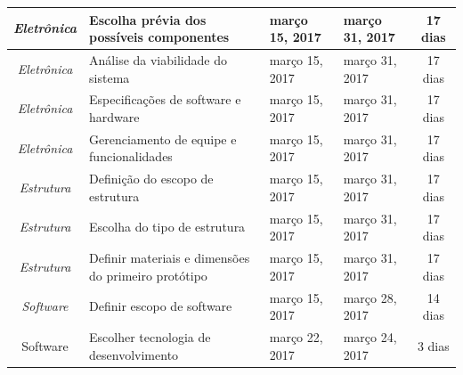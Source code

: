 \begin{longtable}{|c|m{6.5cm}|m{3.2cm}|m{3.2cm}|c|}
\textit{Eletrônica}                                                       & Escolha prévia dos possíveis componentes             & março 15, 2017                       & março 31, 2017                    & 17 dias                               \\ \hline
\textit{Eletrônica}                                                       & Análise da viabilidade do sistema                    & março 15, 2017                       & março 31, 2017                    & 17 dias                               \\ \hline
\textit{Eletrônica}                                                       & Especificações de software e hardware                & março 15, 2017                       & março 31, 2017                    & 17 dias                               \\ \hline
\textit{Eletrônica}                                                       & Gerenciamento de equipe e funcionalidades            & março 15, 2017                       & março 31, 2017                    & 17 dias                               \\ \hline
\textit{Estrutura}                                                        & Definição do escopo de estrutura                     & março 15, 2017                       & março 31, 2017                    & 17 dias                               \\ \hline
\textit{Estrutura}                                                        & Escolha do tipo de estrutura                         & março 15, 2017                       & março 31, 2017                    & 17 dias                               \\ \hline
\textit{Estrutura}                                                        & Definir materiais e dimensões do primeiro protótipo  & março 15, 2017                       & março 31, 2017                    & 17 dias                               \\ \hline
\textit{Software}                                                         & Definir escopo de software                           & março 15, 2017                       & março 28, 2017                    & 14 dias                               \\ \hline
Software                                                                  & Escolher tecnologia de desenvolvimento               & março 22, 2017                       & março 24, 2017                    & 3 dias                                \\ \hline

\end{longtable}

